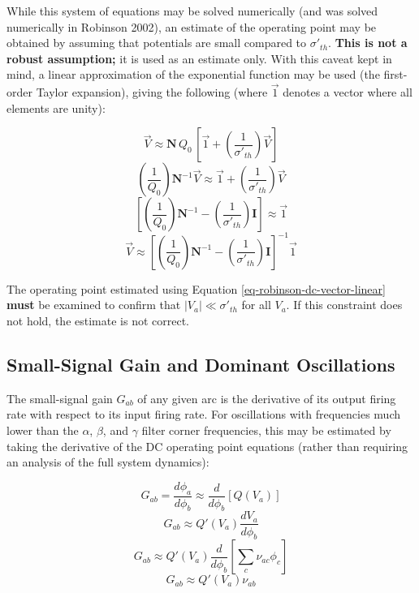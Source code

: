 While this system of equations may be solved numerically (and was solved
numerically in Robinson 2002), an estimate of the operating point may be
obtained by assuming that potentials are small compared to $\sigma'_{th}$.
\textbf{This is not a robust assumption;} it is used as an estimate only.
With this caveat kept in mind, a linear approximation of the exponential
function may be used (the first-order Taylor expansion), giving the following
(where $\vec{1}$ denotes a vector where all elements are unity):

\begin{equation}
\vec{V} \approx \mathbf{N} \, Q_0 \,
\left [ \vec{1} + \left ( \frac{1}{\sigma'_{th}} \right ) \vec{V} \right ]
\end{equation}
%
\begin{equation}
\left ( \frac{1}{Q_0} \right ) \mathbf{N}^{-1} \vec{V}
\approx \vec{1} + \left ( \frac{1}{\sigma'_{th}} \right ) \vec{V}
\end{equation}
%
\begin{equation}
\left [ \left ( \frac{1}{Q_0} \right ) \mathbf{N}^{-1}
- \left ( \frac{1}{\sigma'_{th}} \right ) \mathbf{I} \right ]
\approx \vec{1}
\end{equation}
%
\begin{equation}
\vec{V} \approx
\left [ \left ( \frac{1}{Q_0} \right ) \mathbf{N}^{-1}
- \left ( \frac{1}{\sigma'_{th}} \right ) \mathbf{I} \right ] ^{-1}
\vec{1}
\label{eq-robinson-dc-vector-linear}
\end{equation}

The operating point estimated using Equation
\ref{eq-robinson-dc-vector-linear} \textbf{must} be examined to confirm
that $|V_a| \ll \sigma'_{th}$ for all $V_a$. If this constraint does not
hold, the estimate is not correct.

%
%
\subsection{Small-Signal Gain and Dominant Oscillations}
\label{sect-robinson-math-gain}

The small-signal gain $G_{ab}$ of any given arc is the derivative of its
output firing rate with respect to its input firing rate. For oscillations
with frequencies much lower than the $\alpha$, $\beta$, and $\gamma$ filter
corner frequencies, this may be estimated by taking the derivative of the
DC operating point equations (rather than requiring an analysis of the full
system dynamics):

\begin{equation}
G_{ab} = \frac{d\phi_a}{d\phi_b}
\approx \frac{d}{d\phi_b} \left [ Q(V_a) \right ]
\end{equation}
%
\begin{equation}
G_{ab} \approx Q'(V_a) \frac{dV_a}{d\phi_b}
\end{equation}
%
\begin{equation}
G_{ab} \approx
Q'(V_a) \frac{d}{d\phi_b} \left [ \sum_c \nu_{ac} \phi_c \right ]
\end{equation}
%
\begin{equation}
G_{ab} \approx Q'(V_a) \nu_{ab}
\label{eq-robinson-gain-qprime}
\end{equation}


